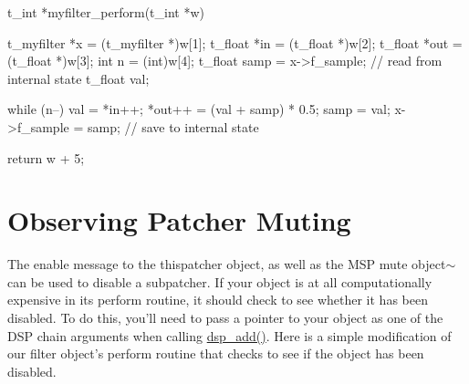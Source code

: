 \begin{DoxyCode}
    t_int *myfilter_perform(t_int *w)
    {
        t_myfilter *x = (t_myfilter *)w[1];
        t_float *in = (t_float *)w[2];
        t_float *out = (t_float *)w[3];
        int n = (int)w[4];
        t_float samp = x->f_sample; // read from internal state
        t_float val;

        while (n--) {
            val = *in++;
            *out++ = (val + samp) * 0.5;
            samp = val;
        }
        x->f_sample = samp;     // save to internal state

        return w + 5;
    }
\end{DoxyCode}
\hypertarget{chapter_msp_advanced_chapter_msp_advanced_muting}{}\section{Observing Patcher Muting}\label{chapter_msp_advanced_chapter_msp_advanced_muting}
The enable message to the thispatcher object, as well as the MSP mute object$\sim$ can be used to disable a subpatcher. If your object is at all computationally expensive in its perform routine, it should check to see whether it has been disabled. To do this, you'll need to pass a pointer to your object as one of the DSP chain arguments when calling \hyperlink{group__msp_gae9a75fa230b1db6d8316405d4a6065cc}{dsp\_\-add()}. Here is a simple modification of our filter object's perform routine that checks to see if the object has been disabled.


